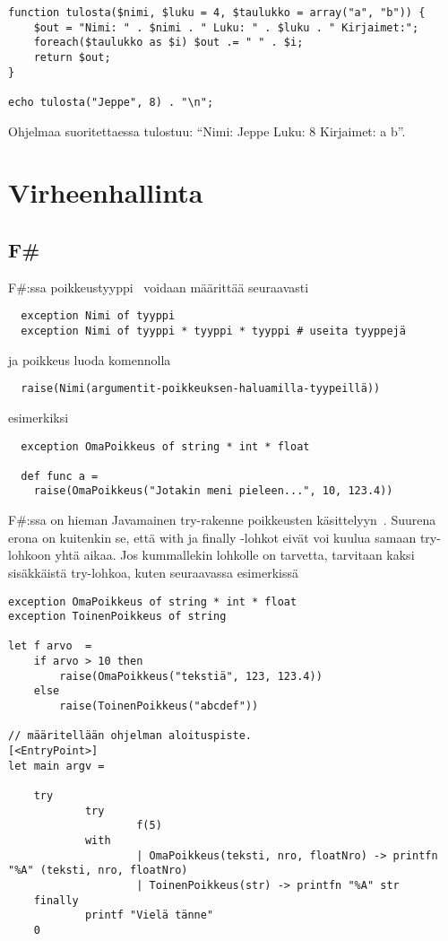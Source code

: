 \begin{lstlisting}
function tulosta($nimi, $luku = 4, $taulukko = array("a", "b")) {
    $out = "Nimi: " . $nimi . " Luku: " . $luku . " Kirjaimet:";
    foreach($taulukko as $i) $out .= " " . $i;
    return $out;
}

echo tulosta("Jeppe", 8) . "\n";
\end{lstlisting}

Ohjelmaa suoritettaessa tulostuu: “Nimi: Jeppe Luku: 8 Kirjaimet: a b”.

\section{Virheenhallinta}

\subsection{F\#}

\lstset{
	language=FSharp,
	basicstyle=\ttfamily,
	breaklines=true,
	columns=fullflexible
}

F\#:ssa poikkeustyyppi~\cite{msn_exceptions} voidaan määrittää seuraavasti

\begin{lstlisting}
  exception Nimi of tyyppi
  exception Nimi of tyyppi * tyyppi * tyyppi # useita tyyppejä
\end{lstlisting}

ja poikkeus luoda komennolla
\begin{lstlisting}
  raise(Nimi(argumentit-poikkeuksen-haluamilla-tyypeillä))
\end{lstlisting}

esimerkiksi
\begin{lstlisting}
  exception OmaPoikkeus of string * int * float
 
  def func a =
    raise(OmaPoikkeus("Jotakin meni pieleen...", 10, 123.4))
\end{lstlisting}

F\#:ssa on hieman Javamainen try\with\finally-rakenne poikkeusten käsittelyyn~\cite{msn_try}. Suurena erona on kuitenkin se, että with ja finally -lohkot eivät voi kuulua samaan try-lohkoon yhtä aikaa. Jos kummallekin lohkolle on tarvetta, tarvitaan kaksi sisäkkäistä try-lohkoa, kuten seuraavassa esimerkissä

\begin{lstlisting}
exception OmaPoikkeus of string * int * float
exception ToinenPoikkeus of string

let f arvo  =
    if arvo > 10 then
        raise(OmaPoikkeus("tekstiä", 123, 123.4))
    else
        raise(ToinenPoikkeus("abcdef"))

// määritellään ohjelman aloituspiste.
[<EntryPoint>]
let main argv =

    try
            try
                    f(5)
            with   
                    | OmaPoikkeus(teksti, nro, floatNro) -> printfn "%A" (teksti, nro, floatNro)
                    | ToinenPoikkeus(str) -> printfn "%A" str
    finally
            printf "Vielä tänne"
    0
\end{lstlisting}

